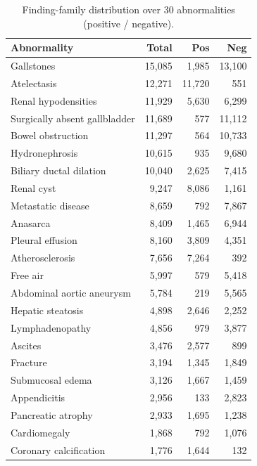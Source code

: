 \begin{table}[t]
\centering
\caption{Finding-family distribution over 30 abnormalities (positive / negative).}
\label{tab:diseases}
\begin{tabular}{lrrr}
\toprule
Abnormality & Total & Pos & Neg \\
\midrule
Gallstones                    & 15{,}085 & 1{,}985 & 13{,}100 \\
Atelectasis                   & 12{,}271 & 11{,}720 & 551 \\
Renal hypodensities           & 11{,}929 & 5{,}630 & 6{,}299 \\
Surgically absent gallbladder & 11{,}689 & 577 & 11{,}112 \\
Bowel obstruction             & 11{,}297 & 564 & 10{,}733 \\
Hydronephrosis                & 10{,}615 & 935 & 9{,}680 \\
Biliary ductal dilation       & 10{,}040 & 2{,}625 & 7{,}415 \\
Renal cyst                    & 9{,}247 & 8{,}086 & 1{,}161 \\
Metastatic disease            & 8{,}659 & 792 & 7{,}867 \\
Anasarca                      & 8{,}409 & 1{,}465 & 6{,}944 \\
Pleural effusion              & 8{,}160 & 3{,}809 & 4{,}351 \\
Atherosclerosis               & 7{,}656 & 7{,}264 & 392 \\
Free air                      & 5{,}997 & 579 & 5{,}418 \\
Abdominal aortic aneurysm     & 5{,}784 & 219 & 5{,}565 \\
Hepatic steatosis             & 4{,}898 & 2{,}646 & 2{,}252 \\
Lymphadenopathy               & 4{,}856 & 979 & 3{,}877 \\
Ascites                       & 3{,}476 & 2{,}577 & 899 \\
Fracture                      & 3{,}194 & 1{,}345 & 1{,}849 \\
Submucosal edema              & 3{,}126 & 1{,}667 & 1{,}459 \\
Appendicitis                  & 2{,}956 & 133 & 2{,}823 \\
Pancreatic atrophy            & 2{,}933 & 1{,}695 & 1{,}238 \\
Cardiomegaly                  & 1{,}868 & 792 & 1{,}076 \\
Coronary calcification        & 1{,}776 & 1{,}644 & 132 \\

\end{tabular}
\end{table}
